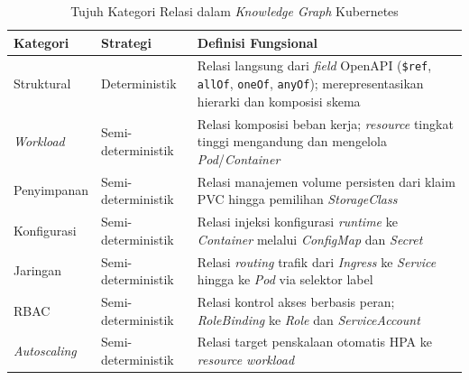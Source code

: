 \renewcommand{\arraystretch}{1.3}
\captionsetup[table]{justification=raggedright,singlelinecheck=false}
\begin{table}[H]
\caption{Tujuh Kategori Relasi dalam \textit{Knowledge Graph} Kubernetes}
\label{tbl:kategori_edge}
\centering
\begin{tabular}{| p{} | p{} | p{} |}
\hline
\textbf{Kategori} & \textbf{Strategi} & \textbf{Definisi Fungsional} \\
\hline
Struktural & Deterministik & Relasi langsung dari \textit{field} OpenAPI (\texttt{\$ref}, \texttt{allOf}, \texttt{oneOf}, \texttt{anyOf}); merepresentasikan hierarki dan komposisi skema \\
\hline
\textit{Workload} & Semi-deterministik & Relasi komposisi beban kerja; \textit{resource} tingkat tinggi mengandung dan mengelola \textit{Pod}/\textit{Container} \\
\hline
Penyimpanan & Semi-deterministik & Relasi manajemen volume persisten dari klaim PVC hingga pemilihan \textit{StorageClass} \\
\hline
Konfigurasi & Semi-deterministik & Relasi injeksi konfigurasi \textit{runtime} ke \textit{Container} melalui \textit{ConfigMap} dan \textit{Secret} \\
\hline
Jaringan & Semi-deterministik & Relasi \textit{routing} trafik dari \textit{Ingress} ke \textit{Service} hingga ke \textit{Pod} via selektor label \\
\hline
RBAC & Semi-deterministik & Relasi kontrol akses berbasis peran; \textit{RoleBinding} ke \textit{Role} dan \textit{ServiceAccount} \\
\hline
\textit{Autoscaling} & Semi-deterministik & Relasi target penskalaan otomatis HPA ke \textit{resource} \textit{workload} \\
\hline
\end{tabular}
\end{table}
